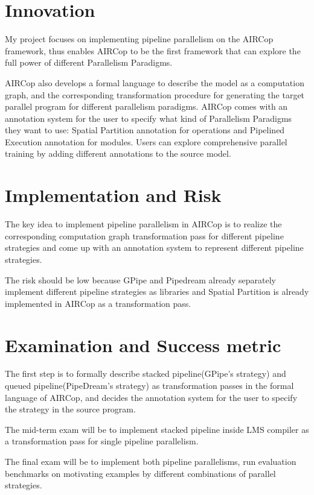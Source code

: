\documentclass[sigplan,nonacm]{acmart}
\begin{document}
\section{Innovation}
My project focuses on implementing pipeline parallelism on the AIRCop framework, thus enables AIRCop to be the first framework that can explore the full power of different Parallelism Paradigms. \par 
 AIRCop also develops a formal language to describe the model as a computation graph, and the corresponding transformation procedure for generating the target parallel program for different parallelism paradigms. AIRCop comes with an annotation system for the user to specify what kind of Parallelism Paradigms they want to use: Spatial Partition annotation for operations and Pipelined Execution annotation for modules. Users can explore comprehensive parallel training by adding different annotations to the source model.
 \section{Implementation and Risk}
 The key idea to implement pipeline parallelism in AIRCop is to realize the corresponding computation graph transformation pass for different pipeline strategies and come up with an annotation system to represent different pipeline strategies.\par
 The risk should be low because GPipe and Pipedream already separately implement different pipeline strategies as libraries and Spatial Partition is already implemented in AIRCop as a transformation pass.
\section{Examination and Success metric}
The first step is to formally describe stacked pipeline(GPipe's strategy) and queued pipeline(PipeDream's strategy) as transformation passes in the formal language of AIRCop, and decides the annotation system for the user to specify the strategy in the source program. \par
The mid-term exam will be to implement stacked pipeline inside LMS compiler as a transformation pass for single pipeline parallelism. \par
The final exam will be to implement both pipeline parallelisms, run evaluation benchmarks on motivating examples by different combinations of parallel strategies. 
\end{document}
